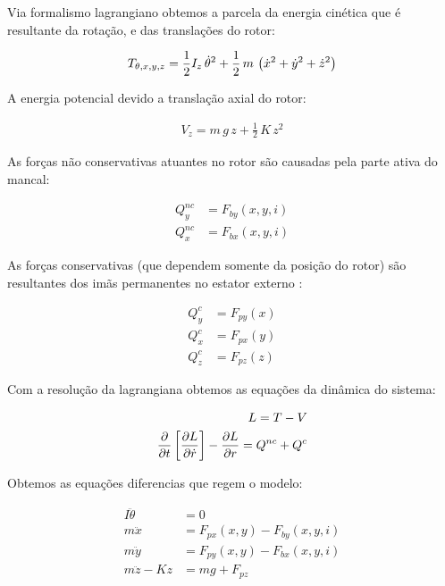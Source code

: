 Via formalismo lagrangiano obtemos a parcela da energia cinética que é resultante da rotação, e das translações do rotor:
 
 \begin{align}
 	T_{\theta, x, y, z} &= \frac{1}{2} I_z \, \dot{\theta}^2 + \frac{1}{2} \, m \, \left( \dot{x}^2 + \dot{y}^2 + \dot{z}^2 \right) \notag \\
 \end{align}
 
 A energia potencial devido a translação axial do rotor:
 
 \begin{eqnarray}
 	V_z = m \, g \, z + \frac{1}{2} \, K \, z^2
 \end{eqnarray}
 
As forças não conservativas atuantes no rotor são causadas pela parte ativa do mancal:
 
 \begin{align}
 	Q_y^{nc} &= F_{by}(x,y,i)  \\
 	Q_x^{nc} &= F_{bx}(x,y,i)  
 \end{align}
 
As forças conservativas  (que dependem somente da posição do rotor) são resultantes dos imãs permanentes no estator externo :
 
 \begin{align}
 	Q_y^{c} &= F_{py}(x)  \\
 	Q_x^{c} &= F_{px}(y)  \\
 	Q_z^{c} &= F_{pz}(z)
 \end{align}
 
 Com a resolução da lagrangiana obtemos as equações da dinâmica do sistema:
  
 \begin{align}
 		L = T - V \notag \\
 		\frac{\partial}{\partial t} \left[ \frac{\partial L}{\partial \dot{r}} \right] -  \frac{\partial L}{\partial r} = Q^{nc} + Q^{c}
 \end{align}
 
Obtemos as equações diferencias que regem o modelo:
 
 \begin{align}
	I \ddot{\theta} &= 0 \\
	m \ddot{x}		&=  F_{px}(x,y) - F_{by}(x,y,i) \\
	m \ddot{y}		&=  F_{py}(x,y) - F_{bx}(x,y,i)\\	
	m \ddot{z} - K z &= m g  + F_{pz}
 \end{align}
 
